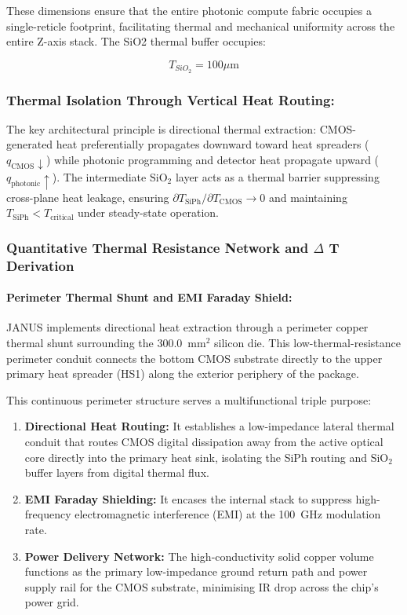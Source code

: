 \documentclass[journal]{IEEEtran}
\begin{document}
These dimensions ensure that the entire photonic compute fabric occupies a single-reticle footprint, facilitating thermal and mechanical uniformity across the entire Z-axis stack. The SiO2 thermal buffer occupies:

\begin{equation}
T_{SiO_2} = 100 \mu\text{m}
\end{equation}

\subsubsection{\textbf{Thermal Isolation Through Vertical Heat Routing:}}

The key architectural principle is directional thermal extraction: CMOS-generated heat preferentially propagates downward toward heat spreaders ($q_{\mathrm{CMOS}} \downarrow$) while photonic programming and detector heat propagate upward ($q_{\mathrm{photonic}} \uparrow$). The intermediate $\mathrm{SiO_2}$ layer acts as a thermal barrier suppressing cross-plane heat leakage, ensuring $\partial T_{\mathrm{SiPh}} / \partial T_{\mathrm{CMOS}} \to 0$ and maintaining $T_{\mathrm{SiPh}} < T_{\mathrm{critical}}$ under steady-state operation.



\subsubsection{\textbf{Quantitative Thermal Resistance Network and $\Delta$ T Derivation}}

\paragraph{\textbf{Perimeter Thermal Shunt and EMI Faraday Shield:}}

JANUS implements directional heat extraction through a perimeter copper thermal shunt surrounding the 300.0~$\text{mm}^{2}$ silicon die. This low-thermal-resistance perimeter conduit connects the bottom CMOS substrate directly to the upper primary heat spreader (HS1) along the exterior periphery of the package.

This continuous perimeter structure serves a multifunctional triple purpose:
\begin{enumerate}
\item \textbf{Directional Heat Routing:} It establishes a low-impedance lateral thermal conduit that routes CMOS digital dissipation away from the active optical core directly into the primary heat sink, isolating the SiPh routing and $\mathrm{SiO_2}$ buffer layers from digital thermal flux.
\item \textbf{EMI Faraday Shielding:} It encases the internal stack to suppress high-frequency electromagnetic interference (EMI) at the 100~GHz modulation rate.
\item \textbf{Power Delivery Network:} The high-conductivity solid copper volume functions as the primary low-impedance ground return path and power supply rail for the CMOS substrate, minimising IR drop across the chip's power grid.
\end{enumerate}
\end{document}
